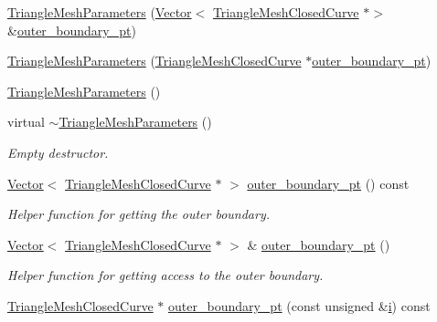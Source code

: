 \begin{DoxyCompactItemize}
\item 
\hyperlink{classoomph_1_1TriangleMeshParameters_ac8e4f397da81bbeaf03aaea8ce85272c}{Triangle\+Mesh\+Parameters} (\hyperlink{classoomph_1_1Vector}{Vector}$<$ \hyperlink{classoomph_1_1TriangleMeshClosedCurve}{Triangle\+Mesh\+Closed\+Curve} $\ast$$>$ \&\hyperlink{classoomph_1_1TriangleMeshParameters_adf9ce760b49599e041fffb041fb4eb0e}{outer\+\_\+boundary\+\_\+pt})
\item 
\hyperlink{classoomph_1_1TriangleMeshParameters_a674b9be72cdd5c72877f07b434882704}{Triangle\+Mesh\+Parameters} (\hyperlink{classoomph_1_1TriangleMeshClosedCurve}{Triangle\+Mesh\+Closed\+Curve} $\ast$\hyperlink{classoomph_1_1TriangleMeshParameters_adf9ce760b49599e041fffb041fb4eb0e}{outer\+\_\+boundary\+\_\+pt})
\item 
\hyperlink{classoomph_1_1TriangleMeshParameters_a942be2020ecd26582855d1920ce23803}{Triangle\+Mesh\+Parameters} ()
\item 
virtual \hyperlink{classoomph_1_1TriangleMeshParameters_a2f475a9f1c9d9d89122cfaf706dfff90}{$\sim$\+Triangle\+Mesh\+Parameters} ()
\begin{DoxyCompactList}\small\item\em Empty destructor. \end{DoxyCompactList}\item 
\hyperlink{classoomph_1_1Vector}{Vector}$<$ \hyperlink{classoomph_1_1TriangleMeshClosedCurve}{Triangle\+Mesh\+Closed\+Curve} $\ast$ $>$ \hyperlink{classoomph_1_1TriangleMeshParameters_adf9ce760b49599e041fffb041fb4eb0e}{outer\+\_\+boundary\+\_\+pt} () const
\begin{DoxyCompactList}\small\item\em Helper function for getting the outer boundary. \end{DoxyCompactList}\item 
\hyperlink{classoomph_1_1Vector}{Vector}$<$ \hyperlink{classoomph_1_1TriangleMeshClosedCurve}{Triangle\+Mesh\+Closed\+Curve} $\ast$ $>$ \& \hyperlink{classoomph_1_1TriangleMeshParameters_aa1b1acddc11df631c8fd692866a59e12}{outer\+\_\+boundary\+\_\+pt} ()
\begin{DoxyCompactList}\small\item\em Helper function for getting access to the outer boundary. \end{DoxyCompactList}\item 
\hyperlink{classoomph_1_1TriangleMeshClosedCurve}{Triangle\+Mesh\+Closed\+Curve} $\ast$ \hyperlink{classoomph_1_1TriangleMeshParameters_a1b2f09177982f5c2f5a96d3f532d6ee7}{outer\+\_\+boundary\+\_\+pt} (const unsigned \&\hyperlink{cfortran_8h_adb50e893b86b3e55e751a42eab3cba82}{i}) const
$$
\end{DoxyCompactItemize}
